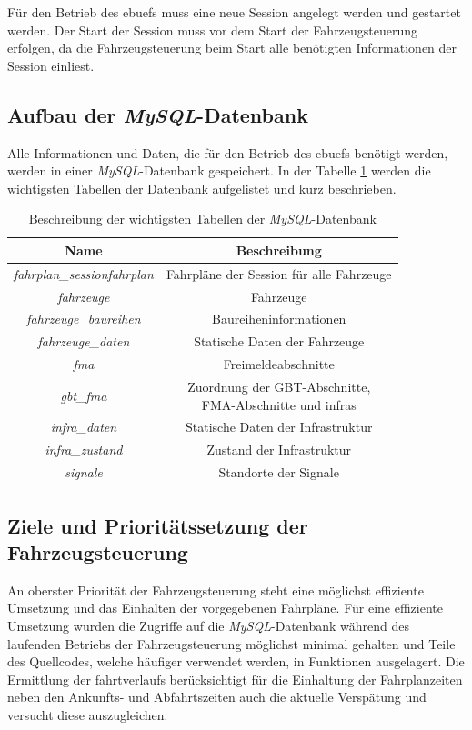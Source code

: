 Für den Betrieb des \ac{ebuef}s muss eine neue Session angelegt werden und gestartet werden. Der Start der Session muss vor dem Start der Fahrzeugsteuerung erfolgen, da die Fahrzeugsteuerung beim Start alle benötigten Informationen der Session einliest.
\subsection{Aufbau der \textit{MySQL}-Datenbank}
Alle Informationen und Daten, die für den Betrieb des \ac{ebuef}s benötigt werden, werden in einer \textit{MySQL}-Datenbank gespeichert. In der Tabelle \ref{table:sqldatenbank} werden die wichtigsten Tabellen der Datenbank aufgelistet und kurz beschrieben.
\begin{table}
\begin{center}
\renewcommand{\arraystretch}{1.2}
\begin{tabular}{c|c}
Name & Beschreibung \\ \hline
\textit{fahrplan\_sessionfahrplan}   	&   	Fahrpläne der Session für alle Fahrzeuge                  \\ \hline
\textit{fahrzeuge}                 		&   	Fahrzeuge                  \\ \hline
\textit{fahrzeuge\_baureihen}&   	Baureiheninformationen                  \\ \hline
\textit{fahrzeuge\_daten}      &   	Statische Daten der Fahrzeuge                  \\ \hline
\textit{fma}                 		&   	Freimeldeabschnitte                  \\ \hline
\textit{gbt\_fma}                 		&   	\makecell{Zuordnung der GBT-Abschnitte,\\FMA-Abschnitte und \acp{infra}}                   \\ \hline
\textit{infra\_daten}           &   	Statische Daten der Infrastruktur                  \\ \hline
\textit{infra\_zustand}       &   	Zustand der Infrastruktur                  \\ \hline
\textit{signale}                 		&   	Standorte der Signale                  \\
\end{tabular}
\renewcommand{\arraystretch}{1}
\caption{Beschreibung der wichtigsten Tabellen der \textit{MySQL}-Datenbank}
\label{table:sqldatenbank}
\end{center}
\end{table}
\subsection{Ziele und Prioritätssetzung der Fahrzeugsteuerung}
An oberster Priorität der Fahrzeugsteuerung steht eine möglichst effiziente Umsetzung und das Einhalten der vorgegebenen Fahrpläne. Für eine effiziente Umsetzung wurden die Zugriffe auf die \textit{MySQL}-Datenbank während des laufenden Betriebs der Fahrzeugsteuerung möglichst minimal gehalten und Teile des Quellcodes, welche häufiger verwendet werden, in Funktionen ausgelagert. Die Ermittlung der \glspl{fahrtverlauf} berücksichtigt für die Einhaltung der Fahrplanzeiten neben den Ankunfts- und Abfahrtszeiten auch die aktuelle Verspätung und versucht diese auszugleichen.

